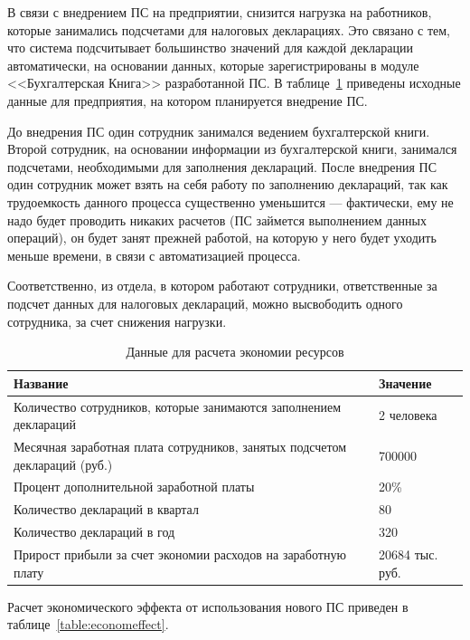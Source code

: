\documentclass[14pt,a4paper]{reportmod}
\begin{document}
В связи с внедрением ПС на предприятии, снизится нагрузка на работников, которые занимались подсчетами для налоговых декларациях. Это связано с тем, что система подсчитывает большинство значений для каждой декларации автоматически, на основании данных, которые зарегистрированы в модуле <<Бухгалтерская Книга>> разработанной ПС. В таблице~\ref{table:freeworkers} приведены исходные данные для предприятия, на котором планируется внедрение ПС.

До внедрения ПС один сотрудник занимался ведением бухгалтерской книги. Второй сотрудник, на основании информации из бухгалтерской книги, занимался подсчетами, необходимыми для заполнения деклараций. После внедрения ПС один сотрудник может взять на себя работу по заполнению деклараций, так как трудоемкость данного процесса существенно уменьшится — фактически, ему не надо будет проводить никаких расчетов (ПС займется выполнением данных операций), он будет занят прежней работой, на которую у него будет уходить меньше времени, в связи с автоматизацией процесса.


Соответственно, из отдела, в котором работают сотрудники, ответственные за подсчет данных для налоговых деклараций, можно высвободить одного сотрудника, за счет снижения нагрузки.

\begin{table}[ht]
  \caption{Данные для расчета экономии ресурсов}
  \small {
  \begin{tabular}{|m{8cm}|m{5cm}|}
    \hline
    \bfseries{Название} &
    \bfseries{Значение} \\
    \hline
    Количество сотрудников, которые занимаются заполнением деклараций & 2 человека\\
    \hline
    Месячная заработная плата сотрудников, занятых подсчетом деклараций (руб.) & 700000 \\
    \hline
    Процент дополнительной заработной платы & 20\% \\
    \hline
    Количество деклараций в квартал & 80 \\
    \hline
    Количество деклараций в год & 320 \\
    \hline
    Прирост прибыли за счет экономии расходов на заработную плату & 20684 тыс. руб. \\
    \hline
  \end{tabular}
}
  \label{table:freeworkers}
\end{table}

Расчет экономического эффекта от использования нового ПС приведен в таблице~\ref{table:economeffect}.
\end{document}
